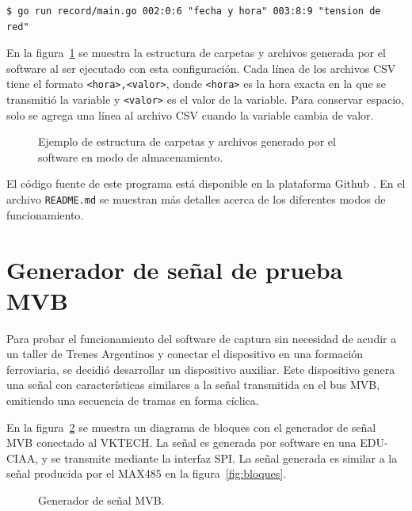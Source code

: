 \begin{lstlisting}[basicstyle=\small,breaklines=true]
$ go run record/main.go 002:0:6 "fecha y hora" 003:8:9 "tension de red"
\end{lstlisting}

En la figura~\ref{fig:carpetas} se muestra la estructura de carpetas y archivos generada por el software al ser ejecutado con esta configuración.
Cada línea de los archivos CSV tiene el formato \texttt{<hora>,\allowbreak <valor>}, donde \texttt{<hora>} es la hora exacta en la que se transmitió la variable y \texttt{<valor>} es el valor de la variable.
Para conservar espacio, solo se agrega una línea al archivo CSV cuando la variable cambia de valor.

\begin{figure}[htbp]
	\centering
    {
        \ttfamily
        \fontsize{8pt}{8pt}\selectfont
        
    }
	\caption{Ejemplo de estructura de carpetas y archivos generado por el software en modo de almacenamiento.}
    \label{fig:carpetas}
\end{figure}

El código fuente de este programa está disponible en la plataforma Github \cite{mvbparse-go}.
En el archivo \texttt{README.md} se muestran más detalles acerca de los diferentes modos de funcionamiento.

\section{Generador de señal de prueba MVB}
\label{sec:generador}

Para probar el funcionamiento del software de captura sin necesidad de acudir a un taller de Trenes Argentinos y conectar el dispositivo en una formación ferroviaria, se decidió desarrollar un dispositivo auxiliar. Este dispositivo genera una señal con características similares a la señal transmitida en el bus MVB, emitiendo una secuencia de tramas en forma cíclica.

En la figura~\ref{fig:generador} se muestra un diagrama de bloques con el generador de señal MVB conectado al VKTECH. La señal es generada por software en una EDU-CIAA, y se transmite mediante la interfaz SPI. La señal generada es similar a la señal producida por el MAX485 en la figura~\ref{fig:bloques}.

\begin{figure}[htbp]
	\centering
    {
        \fontsize{8pt}{8pt}\selectfont
        
    }
	\caption{Generador de señal MVB.}
    \label{fig:generador}
\end{figure}

